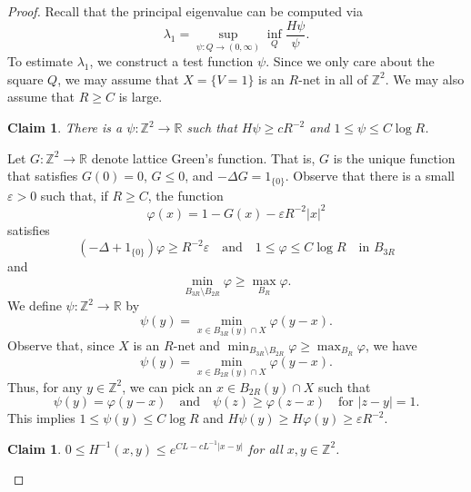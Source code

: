 \documentclass{amsart}
\newtheorem{claim}[equation]{Claim}
\numberwithin{equation}{section}
\numberwithin{figure}{section}
\newcommand{\Z}{\mathbb{Z}}
\newcommand{\R}{\mathbb{R}}
\newcommand{\ep}{\varepsilon}
\newcommand{\id}{1}
\begin{document}
\begin{proof}
Recall that the principal eigenvalue can be computed via
\begin{equation*}
\lambda_1 = \sup_{\psi : Q \to (0,\infty)} \inf_Q \frac{H \psi}{\psi}.
\end{equation*}
To estimate $\lambda_1$, we construct a test function $\psi$.  Since we only care about the square $Q$, we may assume that $X = \{ V = 1 \}$ is an $R$-net in all of $\Z^2$.  We may also assume that $R \geq C$ is large.

\begin{claim}
There is a $\psi : \Z^2 \to \R$ such that $H \psi \geq c R^{-2}$ and $1 \leq \psi \leq C \log R$.
\end{claim}

Let $G : \Z^2 \to \R$ denote lattice Green's function.  That is, $G$ is the unique function that satisfies $G(0) = 0$, $G \leq 0$, and $-\Delta G = \id_{\{ 0 \}}$.  Observe that there is a small $\ep > 0$ such that, if $R \geq C$, the function
\begin{equation*}
\varphi(x) = 1 - G(x) - \ep R^{-2} |x|^2
\end{equation*}
satisfies
\begin{equation*}
(-\Delta + \id_{\{ 0 \}}) \varphi \geq R^{-2} \ep \quad \mbox{and} \quad 1 \leq \varphi \leq C \log R \quad \mbox{in } B_{3R}
\end{equation*}
and
\begin{equation*}
\min_{B_{3R} \setminus B_{2R}} \varphi \geq \max_{B_R} \varphi.
\end{equation*}
We define $\psi : \Z^2 \to \R$ by
\begin{equation*}
\psi(y) = \min_{x \in B_{3R}(y) \cap X} \varphi(y-x).
\end{equation*}
Observe that, since $X$ is an $R$-net and $\min_{B_{3R} \setminus B_{2R}} \varphi \geq \max_{B_R} \varphi$, we have
\begin{equation*}
\psi(y) = \min_{x \in B_{2R}(y) \cap X} \varphi(y-x).
\end{equation*}
Thus, for any $y \in \Z^2$, we can pick an $x \in B_{2R}(y) \cap X$ such that
\begin{equation*}
\psi(y) = \varphi(y - x) \quad \mbox{and} \quad \psi(z) \geq \varphi(z - x) \quad \mbox{for } |z-y| = 1.
\end{equation*}
This implies $1 \leq \psi(y) \leq C \log R$ and $H \psi(y) \geq H \varphi(y) \geq \ep R^{-2}$.

\begin{claim}
$0 \leq H^{-1}(x,y) \leq e^{C L - c L^{-1} |x-y|}$ for all $x, y \in \Z^2$.
\end{claim}


\end{proof}
\end{document}
